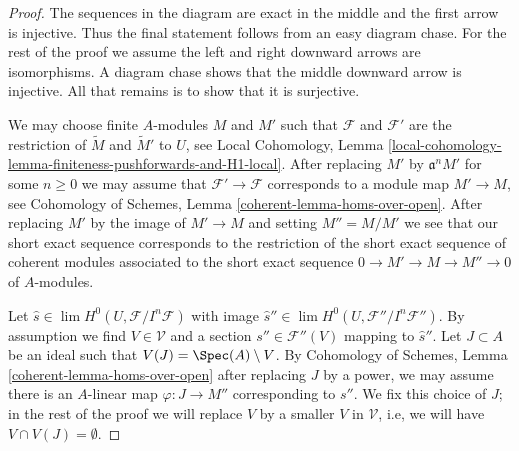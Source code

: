 \begin{proof}
The sequences in the diagram are exact in the middle and the first
arrow is injective. Thus the final statement follows from an easy
diagram chase. For the rest of the proof we assume the left and
right downward arrows are isomorphisms. A diagram chase shows
that the middle downward arrow is injective. All that remains
is to show that it is surjective.

\medskip\noindent
We may choose finite $A$-modules $M$ and $M'$ such that $\mathcal{F}$
and $\mathcal{F}'$ are the restriction
of $\widetilde{M}$ and $\widetilde{M}'$ to $U$, see Local Cohomology, Lemma
\ref{local-cohomology-lemma-finiteness-pushforwards-and-H1-local}.
After replacing $M'$ by $\mathfrak a^n M'$ for some $n \geq 0$
we may assume that $\mathcal{F}' \to \mathcal{F}$
corresponds to a module map $M' \to M$, see
Cohomology of Schemes, Lemma \ref{coherent-lemma-homs-over-open}.
After replacing $M'$ by the image of $M' \to M$
and setting $M'' = M/M'$ we see that our short exact sequence
corresponds to the restriction of the short exact sequence of
coherent modules associated to the short exact sequence
$0 \to M' \to M \to M'' \to 0$ of $A$-modules.

\medskip\noindent
Let $\hat s \in \lim H^0(U, \mathcal{F}/I^n\mathcal{F})$
with image $\hat s'' \in \lim H^0(U, \mathcal{F}''/I^n\mathcal{F}'')$.
By assumption we find $V \in \mathcal{V}$
and a section $s'' \in \mathcal{F}''(V)$ mapping to $\hat s''$.
Let $J \subset A$ be an ideal such that $V(J) = \Spec(A) \setminus V$.
By Cohomology of Schemes, Lemma \ref{coherent-lemma-homs-over-open}
after replacing $J$ by a power, we may assume
there is an $A$-linear map $\varphi : J \to M''$
corresponding to $s''$. We fix this choice of $J$; in the rest
of the proof we will replace $V$ by a smaller $V$ in $\mathcal{V}$,
i.e, we will have $V \cap V(J) = \emptyset$.


\end{proof}
